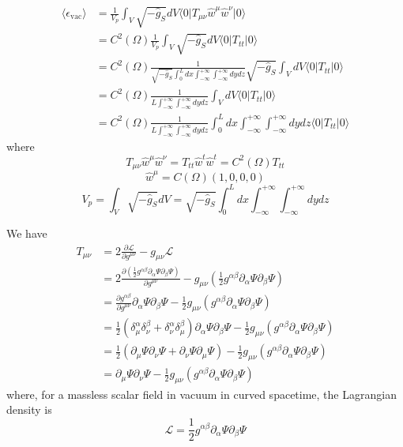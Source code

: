 \documentclass[english]{article}
\begin{document}
\begin{align*}
\langle\epsilon_{\text{vac}}\rangle & =\frac{1}{V_{p}}\int_{V}\sqrt{-\hat{g}_{S}}dV\langle0\vert T_{\mu\nu}\hat{w}^{\mu}\hat{w}^{\nu}\vert0\rangle\\
 & =C^{2}\left(\Omega\right)\frac{1}{V_{p}}\int_{V}\sqrt{-\hat{g}_{S}}dV\langle0\vert T_{tt}\vert0\rangle\\
 & =C^{2}\left(\Omega\right)\frac{1}{\sqrt{-\hat{g}_{S}}\int^{L}_{0}dx\int^{+\infty}_{-\infty}\int^{+\infty}_{-\infty}dydz}\sqrt{-\hat{g}_{S}}\int_{V}dV\langle0\vert T_{tt}\vert0\rangle\\
 & =C^{2}\left(\Omega\right)\frac{1}{L\int^{+\infty}_{-\infty}\int^{+\infty}_{-\infty}dydz}\int_{V}dV\langle0\vert T_{tt}\vert0\rangle\\
 & =C^{2}\left(\Omega\right)\frac{1}{L\int^{+\infty}_{-\infty}\int^{+\infty}_{-\infty}dydz}\int^{L}_{0}dx\int^{+\infty}_{-\infty}\int^{+\infty}_{-\infty}dydz\langle0\vert T_{tt}\vert0\rangle
\end{align*}
 where 
\[
T_{\mu\nu}\hat{w}^{\mu}\hat{w}^{\nu}=T_{tt}\hat{w}^{t}\hat{w}^{t}=C^{2}\left(\Omega\right)T_{tt}
\]
 {}
\[
\hat{w}^{\mu}=C\left(\Omega\right)\left(1,0,0,0\right)
\]
 {}
\[
V_{p}=\int_{V}\sqrt{-\hat{g}_{S}}dV=\sqrt{-\hat{g}_{S}}\int^{L}_{0}dx\int^{+\infty}_{-\infty}\int^{+\infty}_{-\infty}dydz
\]

We have 
\begin{align*}
T_{\mu\nu} & =2\frac{\partial\mathcal{L}}{\partial g^{\mu\nu}}-g_{\mu\nu}\mathcal{L}\\
 & =2\frac{\partial\left(\frac{1}{2}g^{\alpha\beta}\partial_{\alpha}\Psi\partial_{\beta}\Psi\right)}{\partial g^{\mu\nu}}-g_{\mu\nu}\left(\frac{1}{2}g^{\alpha\beta}\partial_{\alpha}\Psi\partial_{\beta}\Psi\right)\\
 & =\frac{\partial g^{\alpha\beta}}{\partial g^{\mu\nu}}\partial_{\alpha}\Psi\partial_{\beta}\Psi-\frac{1}{2}g_{\mu\nu}\left(g^{\alpha\beta}\partial_{\alpha}\Psi\partial_{\beta}\Psi\right)\\
 & =\frac{1}{2}\left(\delta^{\alpha}_{\!\mu}\delta^{\beta}_{\!\nu}+\delta^{\alpha}_{\!\nu}\delta^{\beta}_{\!\mu}\right)\partial_{\alpha}\Psi\partial_{\beta}\Psi-\frac{1}{2}g_{\mu\nu}\left(g^{\alpha\beta}\partial_{\alpha}\Psi\partial_{\beta}\Psi\right)\\
 & =\frac{1}{2}\left(\partial_{\mu}\Psi\partial_{\nu}\Psi+\partial_{\nu}\Psi\partial_{\mu}\Psi\right)-\frac{1}{2}g_{\mu\nu}\left(g^{\alpha\beta}\partial_{\alpha}\Psi\partial_{\beta}\Psi\right)\\
 & =\partial_{\mu}\Psi\partial_{\nu}\Psi-\frac{1}{2}g_{\mu\nu}\left(g^{\alpha\beta}\partial_{\alpha}\Psi\partial_{\beta}\Psi\right)
\end{align*}
 where, for a massless scalar field in vacuum in curved spacetime,
the Lagrangian density is 
\[
\mathcal{L}=\frac{1}{2}g^{\alpha\beta}\partial_{\alpha}\Psi\partial_{\beta}\Psi
\]
\end{document}

